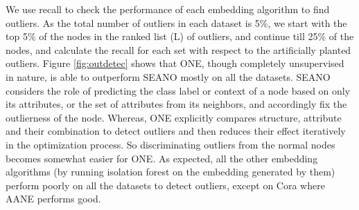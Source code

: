 \documentclass[letterpaper]{article} %
\begin{document}
We use recall to check the performance of each embedding algorithm to find outliers. As the total number of outliers in each dataset is 5\%, we start with the top 5\% of the nodes in the ranked list (L) of outliers, and continue till 25\% of the nodes, and calculate the recall for each set with respect to the artificially planted outliers. Figure \ref{fig:outdetec} shows that ONE, though completely unsupervised in nature, is able to outperform SEANO mostly on all the datasets. 
SEANO considers the role of predicting the class label or context of a node based on only its attributes, or the set of attributes from its neighbors, and accordingly fix the outlierness of the node. Whereas, ONE explicitly compares structure, attribute and their combination to detect outliers and then reduces their effect iteratively in the optimization process. So discriminating outliers from the normal nodes becomes somewhat easier for ONE. As expected, all the other embedding algorithms (by running isolation forest on the embedding generated by them) perform poorly on all the datasets to detect outliers, except on Cora where AANE performs good. 

\end{document}
